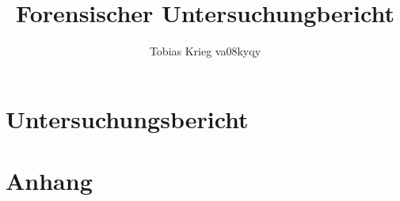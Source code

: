 \documentclass{report}
\title{Forensischer Untersuchungbericht}
\author{Tobias Krieg va08kyqy}
\begin{document}
\maketitle
\newpage
\tableofcontents
\newpage

\part{Untersuchungsbericht}




\part{Anhang}






\end{document}
